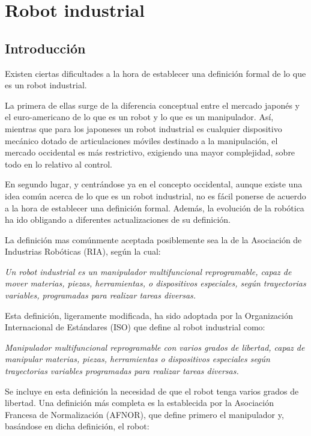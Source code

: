 \documentclass[12pt,a4paper]{report}
\begin{document}
\chapter{Robot industrial}

\section{Introducción}

Existen ciertas dificultades a la hora de establecer una definición formal de lo
que es un robot industrial. 

La primera de ellas surge de la diferencia
conceptual entre el mercado japonés y el euro-americano de lo que es un robot y
lo que es un manipulador. Así, mientras que para los japoneses un robot
industrial es cualquier dispositivo mecánico dotado de articulaciones móviles
destinado a la manipulación, el mercado occidental es más restrictivo, exigiendo
una mayor complejidad, sobre todo en lo relativo al control. 

En segundo lugar, y centrándose ya en el concepto occidental, aunque existe una
idea común acerca de lo que es un robot industrial, no es fácil ponerse de
acuerdo a la hora de establecer una definición formal. Además, la evolución de
la robótica ha ido obligando a diferentes actualizaciones de su definición.

La definición mas comúnmente aceptada posiblemente sea la de la Asociación de
Industrias Robóticas (RIA), según la cual:

\emph{Un robot industrial es un manipulador multifuncional reprogramable, capaz de
mover materias, piezas, herramientas, o dispositivos especiales, según
trayectorias variables, programadas para realizar tareas diversas.}

Esta definición, ligeramente modificada, ha sido adoptada por la Organización
Internacional de Estándares (ISO) que define al robot industrial como:

\emph{Manipulador multifuncional reprogramable con varios grados de libertad, capaz de
manipular materias, piezas, herramientas o dispositivos especiales según
trayectorias variables programadas para realizar tareas diversas.}

Se incluye en esta definición la necesidad de que el robot tenga varios grados
de libertad. Una definición más completa es la establecida por la Asociación
Francesa de Normalización (AFNOR), que define primero el manipulador y,
basándose en dicha definición, el robot:
\end{document}
